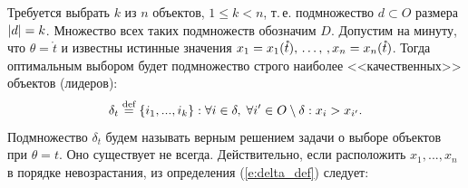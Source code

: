 Требуется выбрать $k$ из $n$ объектов, $1 \leq k < n$, т.\,е. подмножество $d \subset O$ размера $\left| d \right| = k$. Множество всех таких подмножеств обозначим $D$. Допустим на минуту, что $\theta = \mathring t$ и известны истинные значения $x_1 = x_1(\mathring t), \, \ldots,\,, x_n = x_n(\mathring t)$. Тогда оптимальным выбором будет подмножество строго наиболее <<качественных>> объектов (лидеров):
\begin{equation}
    \label{e:delta_def}
    \delta_{t} \overset{\text{def}}{=} \{i_1, ..., i_k\}: \forall i \in \delta,\; \forall i' \in O \setminus \delta: x_i > x_{i'}. 
\end{equation}
Подмножество $\delta_{t}$ будем называть верным решением задачи о выборе объектов при $\theta = t$. Оно существует не всегда. Действительно, если расположить $x_1, ..., x_n$ в порядке невозрастания, из определения (\ref{e:delta_def}) следует:
